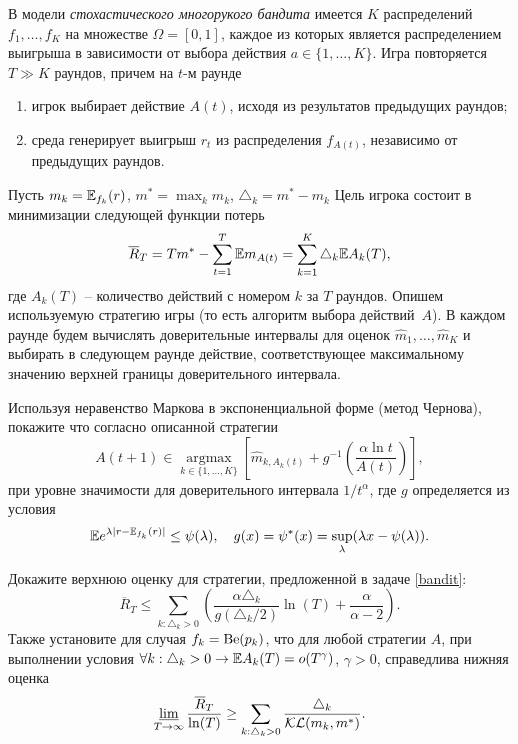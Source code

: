 \begin{problem}
\label{bandit}
В модели \textit{стохастического многорукого бандита} имеется $K$ распределений $f_1, \ldots,f_K$ на множестве $\Omega = [0, 1]$, каждое из которых является распределением выигрыша в зависимости от выбора действия $a \in \{1,\ldots,K\}$. 
Игра повторяется $T \gg K$ раундов, причем на $t$-м раунде
\begin{enumerate}
\item игрок выбирает действие $A(t)$, исходя из результатов предыдущих раундов;
\item среда генерирует выигрыш $r_t$ из распределения  $f_{A(t)}$, независимо от предыдущих раундов.
\end{enumerate}   

Пусть $m_k = \mathrm{{\mathbb E}}_{f_k} (r)$, $m^{*} = \max_{k} m_k$, $\triangle_k = m^{*} - m_k$  
Цель игрока состоит в минимизации следующей функции потерь
\[
\overline{R}_T = T m^{*} - \sum_{t=1}^{T} \mathrm{{\mathbb E}} m_{A(t)} = \sum_{k=1}^{K} \triangle_k \mathrm{{\mathbb E}} A_k(T),
\]
где $A_k(T)$ -- количество действий с номером $k$ за $T$ раундов.
Опишем используемую  стратегию игры (то есть алгоритм выбора действий~$A$).
В каждом раунде будем вычислять доверительные интервалы для оценок $\widehat{m}_1, \ldots, \widehat{m}_K$ и выбирать в следующем раунде действие, соответствующее максимальному значению верхней границы доверительного интервала.

Используя неравенство Маркова в экспоненциальной форме (метод Чернова), покажите 
что согласно описанной стратегии 
\[
A(t+1) \in \mathop{\arg\max} \limits_{k \in \{1,\ldots,K\}} \left[ 
\widehat{m}_{k, A_k(t)} + g^{-1} \left(\frac{\alpha \ln t}{ A(t)} \right)
\right],
\]  
при уровне значимости для доверительного интервала $1 / t^{\alpha}$, где $g$ определяется из условия 
\[
\mathrm{{\mathbb E}} e^{\lambda |r - \mathrm{{\mathbb E}}_{f_k} (r)|} \leq  \psi(\lambda), 
\quad
g(x) = \psi^{*}(x) = \sup_{\lambda} (\lambda x - \psi(\lambda)).  
\] 

\end{problem}


\begin{problem}
Докажите верхнюю оценку для стратегии, предложенной в задаче 
\ref{bandit}:
\[
\overline{R}_T \leq \sum_{k: \triangle_k > 0} \left(
\frac{\alpha \triangle_k}{ g(\triangle_k / 2) } \ln (T	) + \frac{\alpha}{\alpha - 2}
\right).
\]
Также установите для случая $f_k = \mathrm{Be}(p_k)$, что для любой стратегии $A$, при выполнении условия $\forall k: \triangle_k > 0 \to \mathrm{{\mathbb E}} A_k(T) = o(T^{\gamma})$, $\gamma > 0$, справедлива нижняя оценка
\[
\mathop{\underline{\lim}}\limits_{T \to \infty} \frac{\overline{R}_T}{\ln(T)} \geq 
\sum_{k: \triangle_k > 0} 
\frac{\triangle_k}{\mathcal{KL}(m_k, m^{*}) }.
\]
\end{problem}


